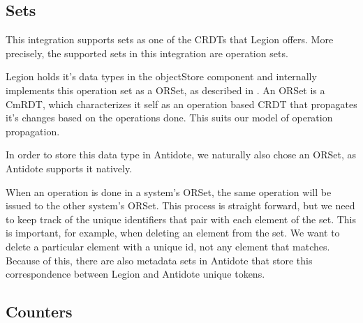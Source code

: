 \subsection{Sets}
\label{sec:sets}
This integration supports sets as one of the CRDTs that Legion offers. More precisely, the supported sets in this integration are operation sets.\par
	Legion holds it's data types in the objectStore component and internally implements this operation set as a ORSet, as described in \cite{crdt}. An ORSet is a CmRDT, which characterizes it self as an operation based CRDT that propagates it's changes based on the operations done. This suits our model of operation propagation.\par
	In order to store this data type in Antidote, we naturally also chose an ORSet, as Antidote supports it natively.\par
	When an operation is done in a system's ORSet, the same operation will be issued to the other system's ORSet. This process is straight forward, but we need to keep track of the unique identifiers that pair with each element of the set. This is important, for example, when deleting an element from the set. We want to delete a particular element with a unique id, not any element that matches. Because of this, there are also metadata sets in Antidote that store this correspondence between Legion and Antidote unique tokens.

\subsection{Counters}
\label{sec:counters}

